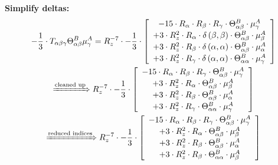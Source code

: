 \documentclass{article}
\begin{document}
\textbf{Simplify deltas:}
\begin{subequations}\begin{gather}
- \frac{1}{3} \cdot T_{\alpha{}\beta{}\gamma{}} \Theta{}^{B}_{\alpha{}\beta{}} \mu{}^{A}_{\gamma{}} = R_{z}^{-7} \cdot - \frac{1}{3} \cdot  \left[ \begin{array}{c} 
 		- 15 \cdot R_{\alpha{}} \cdot R_{\beta{}} \cdot R_{\gamma{}} \cdot \Theta{}^{B}_{\alpha{}\beta{}} \cdot \mu{}^{A}_{\gamma{}} 
 \\[0.2em] 		 + 3 \cdot R_{z}^{2} \cdot R_{\alpha{}} \cdot \delta{}\left(\beta{}, \beta{}\right) \cdot \Theta{}^{B}_{\alpha{}\beta{}} \cdot \mu{}^{A}_{\beta{}} 
 \\[0.2em] 		 + 3 \cdot R_{z}^{2} \cdot R_{\beta{}} \cdot \delta{}\left(\alpha{}, \alpha{}\right) \cdot \Theta{}^{B}_{\alpha{}\beta{}} \cdot \mu{}^{A}_{\alpha{}} 
 \\[0.2em] 		 + 3 \cdot R_{z}^{2} \cdot R_{\gamma{}} \cdot \delta{}\left(\alpha{}, \alpha{}\right) \cdot \Theta{}^{B}_{\alpha{}\alpha{}} \cdot \mu{}^{A}_{\gamma{}}
 \end{array}\right] 
\\ \xRightarrow{\text{cleaned up}}
 R_{z}^{-7} \cdot - \frac{1}{3} \cdot  \left[ \begin{array}{c} 
 		- 15 \cdot R_{\alpha{}} \cdot R_{\beta{}} \cdot R_{\gamma{}} \cdot \Theta{}^{B}_{\alpha{}\beta{}} \cdot \mu{}^{A}_{\gamma{}} 
 \\[0.2em] 		 + 3 \cdot R_{z}^{2} \cdot R_{\alpha{}} \cdot \Theta{}^{B}_{\alpha{}\beta{}} \cdot \mu{}^{A}_{\beta{}} 
 \\[0.2em] 		 + 3 \cdot R_{z}^{2} \cdot R_{\beta{}} \cdot \Theta{}^{B}_{\alpha{}\beta{}} \cdot \mu{}^{A}_{\alpha{}} 
 \\[0.2em] 		 + 3 \cdot R_{z}^{2} \cdot R_{\gamma{}} \cdot \Theta{}^{B}_{\alpha{}\alpha{}} \cdot \mu{}^{A}_{\gamma{}}
 \end{array}\right] 
\\ \xRightarrow{\text{reduced indices}}
 R_{z}^{-7} \cdot - \frac{1}{3} \cdot  \left[ \begin{array}{c} 
 		- 15 \cdot R_{\alpha{}} \cdot R_{\beta{}} \cdot R_{\gamma{}} \cdot \Theta{}^{B}_{\alpha{}\beta{}} \cdot \mu{}^{A}_{\gamma{}} 
 \\[0.2em] 		 + 3 \cdot R_{z}^{2} \cdot R_{\alpha{}} \cdot \Theta{}^{B}_{\alpha{}\beta{}} \cdot \mu{}^{A}_{\beta{}} 
 \\[0.2em] 		 + 3 \cdot R_{z}^{2} \cdot R_{\beta{}} \cdot \Theta{}^{B}_{\alpha{}\beta{}} \cdot \mu{}^{A}_{\alpha{}} 
 \\[0.2em] 		 + 3 \cdot R_{z}^{2} \cdot R_{\beta{}} \cdot \Theta{}^{B}_{\alpha{}\alpha{}} \cdot \mu{}^{A}_{\beta{}}
 \end{array}\right] 
\end{gather}\end{subequations}
\end{document}
